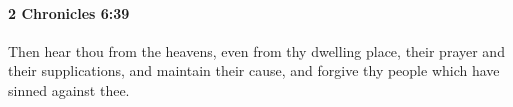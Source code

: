 
		\paragraph{2 Chronicles 6:39} %
			\label{2CHRONICLES-6-39}

			Then hear thou from the heavens, even from thy dwelling place, their prayer and their supplications, and maintain their cause, and forgive thy people which have sinned against thee.


